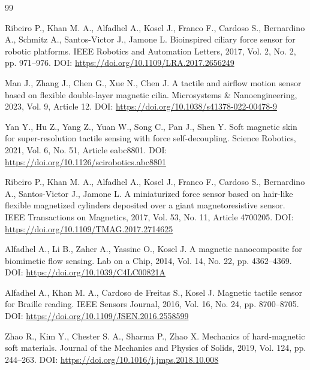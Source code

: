 \documentclass[14pt,a4paper]{extarticle}
\begin{document}
\clearpage
{}
{}
\begin{thebibliography}{99}

Ribeiro P., Khan M. A., Alfadhel A., Kosel J., Franco F., Cardoso S., Bernardino A., Schmitz A., Santos-Victor J., Jamone L.
\newblock Bioinspired ciliary force sensor for robotic platforms.
\newblock IEEE Robotics and Automation Letters, 2017, Vol. 2, No. 2, pp. 971--976.
\newblock DOI: \url{https://doi.org/10.1109/LRA.2017.2656249}

Man J., Zhang J., Chen G., Xue N., Chen J.
\newblock A tactile and airflow motion sensor based on flexible double-layer magnetic cilia.
\newblock Microsystems \& Nanoengineering, 2023, Vol. 9, Article 12.
\newblock DOI: \url{https://doi.org/10.1038/s41378-022-00478-9}

Yan Y., Hu Z., Yang Z., Yuan W., Song C., Pan J., Shen Y.
\newblock Soft magnetic skin for super-resolution tactile sensing with force self-decoupling.
\newblock Science Robotics, 2021, Vol. 6, No. 51, Article eabc8801.
\newblock DOI: \url{https://doi.org/10.1126/scirobotics.abc8801}

Ribeiro P., Khan M. A., Alfadhel A., Kosel J., Franco F., Cardoso S., Bernardino A., Santos-Victor J., Jamone L.
\newblock A miniaturized force sensor based on hair-like flexible magnetized cylinders deposited over a giant magnetoresistive sensor.
\newblock IEEE Transactions on Magnetics, 2017, Vol. 53, No. 11, Article 4700205.
\newblock DOI: \url{https://doi.org/10.1109/TMAG.2017.2714625}

Alfadhel A., Li B., Zaher A., Yassine O., Kosel J.
\newblock A magnetic nanocomposite for biomimetic flow sensing.
\newblock Lab on a Chip, 2014, Vol. 14, No. 22, pp. 4362--4369.
\newblock DOI: \url{https://doi.org/10.1039/C4LC00821A}

Alfadhel A., Khan M. A., Cardoso de Freitas S., Kosel J.
\newblock Magnetic tactile sensor for Braille reading.
\newblock IEEE Sensors Journal, 2016, Vol. 16, No. 24, pp. 8700--8705.
\newblock DOI: \url{https://doi.org/10.1109/JSEN.2016.2558599}

Zhao R., Kim Y., Chester S. A., Sharma P., Zhao X.
\newblock Mechanics of hard-magnetic soft materials.
\newblock Journal of the Mechanics and Physics of Solids, 2019, Vol. 124, pp. 244--263.
\newblock DOI: \url{https://doi.org/10.1016/j.jmps.2018.10.008}


\end{thebibliography}
\end{document}

